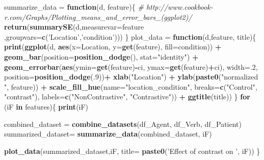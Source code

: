\documentclass[]{article}
\newenvironment{Shaded}{\begin{snugshade}}{\end{snugshade}}
\newcommand{\CommentTok}[1]{\textcolor[rgb]{0.56,0.35,0.01}{\textit{#1}}}
\newcommand{\ControlFlowTok}[1]{\textcolor[rgb]{0.13,0.29,0.53}{\textbf{#1}}}
\newcommand{\DataTypeTok}[1]{\textcolor[rgb]{0.13,0.29,0.53}{#1}}
\newcommand{\DecValTok}[1]{\textcolor[rgb]{0.00,0.00,0.81}{#1}}
\newcommand{\KeywordTok}[1]{\textcolor[rgb]{0.13,0.29,0.53}{\textbf{#1}}}
\newcommand{\NormalTok}[1]{#1}
\newcommand{\OperatorTok}[1]{\textcolor[rgb]{0.81,0.36,0.00}{\textbf{#1}}}
\newcommand{\StringTok}[1]{\textcolor[rgb]{0.31,0.60,0.02}{#1}}
\begin{document}
\begin{Shaded}
\begin{Highlighting}[]
\NormalTok{summarize_data =}\StringTok{ }\ControlFlowTok{function}\NormalTok{(d, feature)\{}
  \CommentTok{# http://www.cookbook-r.com/Graphs/Plotting_means_and_error_bars_(ggplot2)/}
  \KeywordTok{return}\NormalTok{(}\KeywordTok{summarySE}\NormalTok{(d,}\DataTypeTok{measurevar=}\NormalTok{feature ,}\DataTypeTok{groupvars=}\KeywordTok{c}\NormalTok{(}\StringTok{'Location'}\NormalTok{,}\StringTok{'condition'}\NormalTok{)))}
\NormalTok{\}}
\NormalTok{plot_data =}\StringTok{ }\ControlFlowTok{function}\NormalTok{(d,feature, title)\{}
  \KeywordTok{print}\NormalTok{(}\KeywordTok{ggplot}\NormalTok{(d, }\KeywordTok{aes}\NormalTok{(}\DataTypeTok{x=}\NormalTok{Location, }\DataTypeTok{y=}\KeywordTok{get}\NormalTok{(feature), }\DataTypeTok{fill=}\NormalTok{condition)) }\OperatorTok{+}\StringTok{ }
\StringTok{    }\KeywordTok{geom_bar}\NormalTok{(}\DataTypeTok{position=}\KeywordTok{position_dodge}\NormalTok{(), }\DataTypeTok{stat=}\StringTok{"identity"}\NormalTok{) }\OperatorTok{+}
\StringTok{    }\KeywordTok{geom_errorbar}\NormalTok{(}\KeywordTok{aes}\NormalTok{(}\DataTypeTok{ymin=}\KeywordTok{get}\NormalTok{(feature)}\OperatorTok{-}\NormalTok{ci, }\DataTypeTok{ymax=}\KeywordTok{get}\NormalTok{(feature)}\OperatorTok{+}\NormalTok{ci),}
                  \DataTypeTok{width=}\NormalTok{.}\DecValTok{2}\NormalTok{,                   }
                  \DataTypeTok{position=}\KeywordTok{position_dodge}\NormalTok{(.}\DecValTok{9}\NormalTok{))}\OperatorTok{+}
\StringTok{    }\KeywordTok{xlab}\NormalTok{(}\StringTok{"Location"}\NormalTok{) }\OperatorTok{+}
\StringTok{    }\KeywordTok{ylab}\NormalTok{(}\KeywordTok{paste0}\NormalTok{(}\StringTok{"normalized "}\NormalTok{, feature)) }\OperatorTok{+}
\StringTok{    }\KeywordTok{scale_fill_hue}\NormalTok{(}\DataTypeTok{name=}\StringTok{"location_condition"}\NormalTok{, }
                   \DataTypeTok{breaks=}\KeywordTok{c}\NormalTok{(}\StringTok{"Control"}\NormalTok{, }\StringTok{"contrast"}\NormalTok{),}
                   \DataTypeTok{labels=}\KeywordTok{c}\NormalTok{(}\StringTok{"NonContrastive"}\NormalTok{, }\StringTok{"Contrastive"}\NormalTok{)) }\OperatorTok{+}
\StringTok{    }\KeywordTok{ggtitle}\NormalTok{(title))}
\NormalTok{\}}
\ControlFlowTok{for}\NormalTok{ (iF }\ControlFlowTok{in}\NormalTok{ features)\{}
  \KeywordTok{print}\NormalTok{(iF)}
  
\NormalTok{  combined_dataset =}\StringTok{ }\KeywordTok{combine_datasets}\NormalTok{(df_Agent, df_Verb, df_Patient)}
\NormalTok{  summarized_dataset=}\StringTok{ }\KeywordTok{summarize_data}\NormalTok{(combined_dataset, iF)}
  
  
  \KeywordTok{plot_data}\NormalTok{(summarized_dataset,iF, }\DataTypeTok{title=} \KeywordTok{paste0}\NormalTok{(}\StringTok{'Effect of contrast on '}\NormalTok{, iF))}
\NormalTok{\}}
\end{Highlighting}
\end{Shaded}
\end{document}
